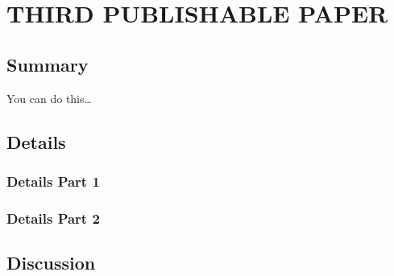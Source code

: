 \chapter{\uppercase{Third Publishable Paper} \label{chapter:04}}

\section{Summary}
You can do this\ldots

\section{Details}
\lipsum[1]

\subsection{Details Part 1}
\lipsum

\subsection{Details Part 2}
\lipsum

\section{Discussion}
\lipsum
